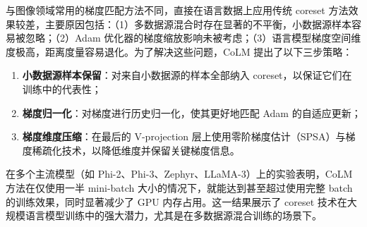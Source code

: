 \documentclass[lang=cn,newtx,10pt,scheme=chinese,chinesefont=nofont,citestyle=gb7714-2015, bibstyle=gb7714-2015]{elegantbook}
\begin{document}
\begin{refsection}
\begin{example}
与图像领域常用的梯度匹配方法不同，直接在语言数据上应用传统 coreset 方法效果较差，主要原因包括：（1）多数据源混合时存在显著的不平衡，小数据源样本容易被忽略；（2）Adam 优化器的梯度缩放影响未被考虑；（3）语言模型梯度空间维度极高，距离度量容易退化。为了解决这些问题，CoLM 提出了以下三步策略：
\begin{enumerate}
    \item \textbf{小数据源样本保留}：对来自小数据源的样本全部纳入 coreset，以保证它们在训练中的代表性；
    \item \textbf{梯度归一化}：对梯度进行历史归一化，使其更好地匹配 Adam 的自适应更新；
    \item \textbf{梯度维度压缩}：在最后的 V-projection 层上使用零阶梯度估计（SPSA）与梯度稀疏化技术，以降低维度并保留关键梯度信息。
\end{enumerate}

在多个主流模型（如 Phi-2、Phi-3、Zephyr、LLaMA-3）上的实验表明，CoLM 方法在仅使用一半 mini-batch 大小的情况下，就能达到甚至超过使用完整 batch 的训练效果，同时显著减少了 GPU 内存占用。这一结果展示了 coreset 技术在大规模语言模型训练中的强大潜力，尤其是在多数据源混合训练的场景下。
\end{example}


\printbibliography[heading=subbibliography, title={本章参考文献}]
\end{refsection}
\end{document}
